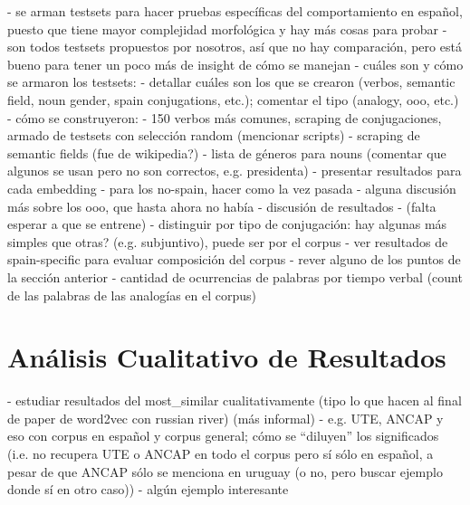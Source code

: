 - se arman testsets para hacer pruebas específicas del comportamiento en español, puesto que tiene mayor complejidad morfológica y hay más cosas para probar
- son todos testsets propuestos por nosotros, así que no hay comparación, pero está bueno para tener un poco más de insight de cómo se manejan
- cuáles son y cómo se armaron los testsets:
    - detallar cuáles son los que se crearon (verbos, semantic field, noun gender, spain conjugations, etc.); comentar el tipo (analogy, ooo, etc.)
    - cómo se construyeron:
        - 150 verbos más comunes, scraping de conjugaciones, armado de testsets con selección random (mencionar scripts)
        - scraping de semantic fields (fue de wikipedia?)
        - lista de géneros para nouns (comentar que algunos se usan pero no son correctos, e.g. presidenta)
- presentar resultados para cada embedding
    - para los no-spain, hacer como la vez pasada
    - alguna discusión más sobre los ooo, que hasta ahora no había
- discusión de resultados
    - (falta esperar a que se entrene)
    - distinguir por tipo de conjugación: hay algunas más simples que otras? (e.g. subjuntivo), puede ser por el corpus
    - ver resultados de spain-specific para evaluar composición del corpus
    - rever alguno de los puntos de la sección anterior
    - cantidad de ocurrencias de palabras por tiempo verbal (count de las palabras de las analogías en el corpus)


\section{Análisis Cualitativo de Resultados}

- estudiar resultados del most_similar cualitativamente (tipo lo que hacen al final de paper de word2vec con russian river)
  (más informal)
- e.g. UTE, ANCAP y eso con corpus en español y corpus general; cómo se ``diluyen'' los significados (i.e. no recupera UTE o ANCAP en todo el corpus pero sí sólo en español, a pesar de que ANCAP sólo se menciona en uruguay (o no, pero buscar ejemplo donde sí en otro caso))
- algún ejemplo interesante
